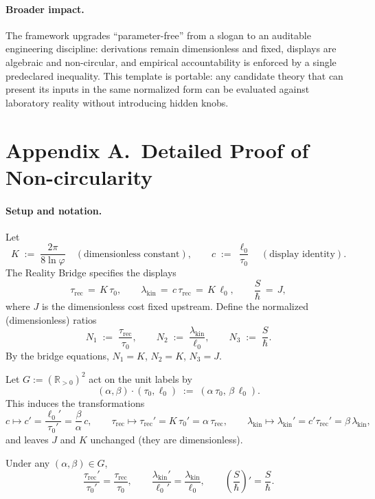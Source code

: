 \documentclass[11pt]{article}
\theoremstyle{plain}
\theoremstyle{definition}
\theoremstyle{remark}
\begin{document}
\paragraph{Broader impact.}
The framework upgrades “parameter-free” from a slogan to an auditable engineering discipline: derivations remain dimensionless and fixed, displays are algebraic and non-circular, and empirical accountability is enforced by a single predeclared inequality. This template is portable: any candidate theory that can present its inputs in the same normalized form can be evaluated against laboratory reality without introducing hidden knobs.

\appendix

\section*{Appendix A.\ Detailed Proof of Non-circularity}

\paragraph{Setup and notation.}
Let
\[
K\;:=\;\frac{2\pi}{8\ln\varphi}\quad(\text{dimensionless constant}),\qquad
c\;:=\;\frac{\ell_{0}}{\tau_{0}}\quad(\text{display identity}).
\]
The Reality Bridge specifies the displays
\[
\tau_{\mathrm{rec}}\,=\,K\,\tau_{0},\qquad
\lambda_{\mathrm{kin}}\,=\,c\,\tau_{\mathrm{rec}}\,=\,K\,\ell_{0},\qquad
\frac{S}{\hbar}\,=\,J,
\]
where \(J\) is the dimensionless cost fixed upstream. Define the normalized (dimensionless) ratios
\[
N_{1}\;:=\;\frac{\tau_{\mathrm{rec}}}{\tau_{0}},\qquad
N_{2}\;:=\;\frac{\lambda_{\mathrm{kin}}}{\ell_{0}},\qquad
N_{3}\;:=\;\frac{S}{\hbar}.
\]
By the bridge equations, \(N_{1}=K\), \(N_{2}=K\), \(N_{3}=J\).

\begin{definition}
Let \(G:=(\mathbb{R}_{>0})^{2}\) act on the unit labels by
\[
(\alpha,\beta)\cdot(\tau_{0},\ell_{0})\;:=\;(\alpha\,\tau_{0},\,\beta\,\ell_{0}).
\]
This induces the transformations
\[
c\mapsto c'=\frac{\ell_{0}'}{\tau_{0}'}=\frac{\beta}{\alpha}\,c,\qquad
\tau_{\mathrm{rec}}\mapsto\tau_{\mathrm{rec}}'=K\,\tau_{0}'=\alpha\,\tau_{\mathrm{rec}},\qquad
\lambda_{\mathrm{kin}}\mapsto\lambda_{\mathrm{kin}}'=c'\tau_{\mathrm{rec}}'=\beta\,\lambda_{\mathrm{kin}},
\]
and leaves \(J\) and \(K\) unchanged (they are dimensionless).
\end{definition}

\begin{lemma}\label{lem:equivariance}
Under any \((\alpha,\beta)\in G\),
\[
\frac{\tau_{\mathrm{rec}}'}{\tau_{0}'}=\frac{\tau_{\mathrm{rec}}}{\tau_{0}},\qquad
\frac{\lambda_{\mathrm{kin}}'}{\ell_{0}'}=\frac{\lambda_{\mathrm{kin}}}{\ell_{0}},\qquad
\left(\frac{S}{\hbar}\right)'\!=\frac{S}{\hbar}.
\]
\end{lemma}
\end{document}
